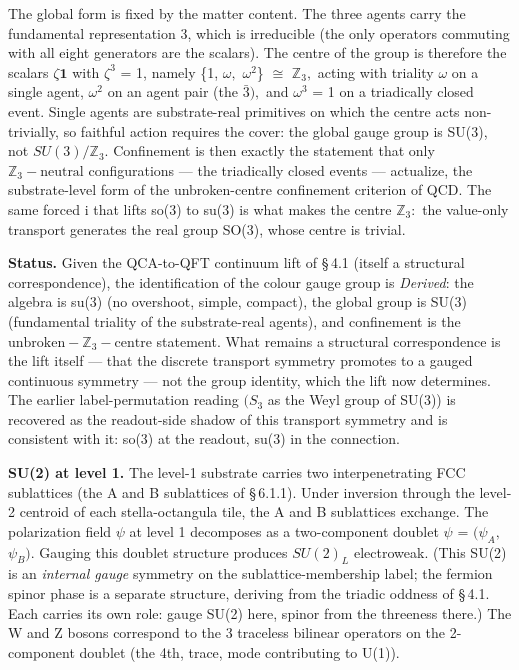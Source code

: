 \documentclass[11pt,oneside]{report}
\theoremstyle{definition}
\theoremstyle{remark}
\begin{document}
The global form is fixed by the matter content. The three agents carry
the fundamental representation 3, which is irreducible (the only
operators commuting with all eight generators are the scalars). The
centre of the group is therefore the scalars \ensuremath{\zeta \mathbf{1}} with \ensuremath{\zeta^{3}} = 1, namely \{1,
\ensuremath{\omega ,} \ensuremath{\omega^{2}}\} \ensuremath{\cong} \ensuremath{\mathbb{Z}_{3},} acting with triality \ensuremath{\omega} on a single agent, \ensuremath{\omega^{2}} on an agent
pair (the \ensuremath{\bar{3}),} and \ensuremath{\omega^{3}} = 1 on a triadically closed event. Single agents
are substrate-real primitives on which the centre acts non-trivially, so
faithful action requires the cover: the global gauge group is SU(3), not
\ensuremath{SU(3)/\mathbb{Z}_{3}.} Confinement is then exactly the statement that only \ensuremath{\mathbb{Z}_{3}-\text{neutral}}
configurations --- the triadically closed events --- actualize, the
substrate-level form of the unbroken-centre confinement criterion of
QCD. The same forced i that lifts so(3) to su(3) is what makes the
centre \ensuremath{\mathbb{Z}_{3}:} the value-only transport generates the real group SO(3),
whose centre is trivial.

\textbf{Status.} Given the QCA-to-QFT continuum lift of \S\,4.1 (itself a
structural correspondence), the identification of the colour gauge group
is \emph{Derived}: the algebra is su(3) (no overshoot, simple, compact),
the global group is SU(3) (fundamental triality of the substrate-real
agents), and confinement is the \ensuremath{\text{unbroken}-\mathbb{Z}_{3}-\text{centre}} statement. What
remains a structural correspondence is the lift itself --- that the
discrete transport symmetry promotes to a gauged continuous symmetry ---
not the group identity, which the lift now determines. The earlier
label-permutation reading \ensuremath{(S_{3}} as the Weyl group of SU(3)) is recovered
as the readout-side shadow of this transport symmetry and is consistent
with it: so(3) at the readout, su(3) in the connection.

\textbf{SU(2) at level 1.} The level-1 substrate carries two
interpenetrating FCC sublattices (the A and B sublattices of \S\,6.1.1).
Under inversion through the level-2 centroid of each stella-octangula
tile, the A and B sublattices exchange. The polarization field \ensuremath{\psi} at
level 1 decomposes as a two-component doublet \ensuremath{\psi} = \ensuremath{(\psi_{A},} \ensuremath{\psi_{B}).} Gauging
this doublet structure produces \ensuremath{SU(2)_{L}} electroweak. (This SU(2) is an
\emph{internal gauge} symmetry on the sublattice-membership label; the
fermion spinor phase is a separate structure, deriving from the triadic
oddness of \S\,4.1. Each carries its own role: gauge SU(2) here, spinor from
the threeness there.) The W and Z bosons
correspond to the 3 traceless bilinear operators on the 2-component
doublet (the 4th, trace, mode contributing to U(1)).
\end{document}
